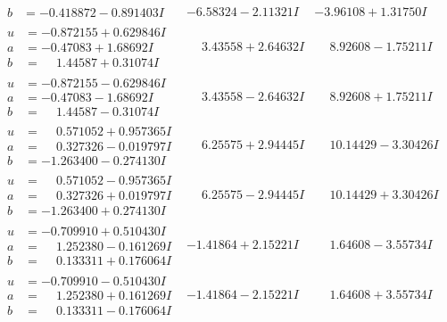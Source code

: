 \documentclass[1p]{elsarticle_modified}
\theoremstyle{definition}
\begin{document}
$$\begin{array}{c|c|c}
\begin{aligned}
b &= -0.418872 - 0.891403 I\end{aligned}
 & -6.58324 - 2.11321 I & -3.96108 + 1.31750 I \\ \hline\begin{aligned}
u &= -0.872155 + 0.629846 I \\
a &= -0.47083 + 1.68692 I \\
b &= \phantom{-}1.44587 + 0.31074 I\end{aligned}
 & \phantom{-}3.43558 + 2.64632 I & \phantom{-}8.92608 - 1.75211 I \\ \hline\begin{aligned}
u &= -0.872155 - 0.629846 I \\
a &= -0.47083 - 1.68692 I \\
b &= \phantom{-}1.44587 - 0.31074 I\end{aligned}
 & \phantom{-}3.43558 - 2.64632 I & \phantom{-}8.92608 + 1.75211 I \\ \hline\begin{aligned}
u &= \phantom{-}0.571052 + 0.957365 I \\
a &= \phantom{-}0.327326 - 0.019797 I \\
b &= -1.263400 - 0.274130 I\end{aligned}
 & \phantom{-}6.25575 + 2.94445 I & \phantom{-}10.14429 - 3.30426 I \\ \hline\begin{aligned}
u &= \phantom{-}0.571052 - 0.957365 I \\
a &= \phantom{-}0.327326 + 0.019797 I \\
b &= -1.263400 + 0.274130 I\end{aligned}
 & \phantom{-}6.25575 - 2.94445 I & \phantom{-}10.14429 + 3.30426 I \\ \hline\begin{aligned}
u &= -0.709910 + 0.510430 I \\
a &= \phantom{-}1.252380 - 0.161269 I \\
b &= \phantom{-}0.133311 + 0.176064 I\end{aligned}
 & -1.41864 + 2.15221 I & \phantom{-}1.64608 - 3.55734 I \\ \hline\begin{aligned}
u &= -0.709910 - 0.510430 I \\
a &= \phantom{-}1.252380 + 0.161269 I \\
b &= \phantom{-}0.133311 - 0.176064 I\end{aligned}
 & -1.41864 - 2.15221 I & \phantom{-}1.64608 + 3.55734 I \\ \hline\begin{aligned}

\end{aligned}
\end{array}$$
\end{document}
